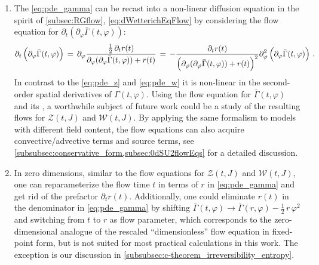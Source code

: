 \begin{enumerate}
	\item	The \pde{} \eqref{eq:pde_gamma} can be recast into a non-linear diffusion equation in the spirit of \cref{subsec:RGflow}, \viz{} \cref{eq:dWetterichEqFlow} by considering the flow equation for $\partial_t (\partial_\varphi\bar{\Gamma}(t,\varphi))$:
	\begin{align}
		\partial_t \del{\partial_\varphi\bar{\Gamma}(t,\varphi)}\, =\, \partial_\varphi\frac{\frac{1}{2} \, \partial_t r ( t )}{\partial_\varphi(\partial_\varphi\bar{\Gamma}(t,\varphi)) + r ( t )} \,=\,
		-\frac{\partial_t r ( t )}{\del{\partial_\varphi(\partial_\varphi\bar{\Gamma}(t,\varphi)) + r ( t )}^2} \partial_\varphi^2\del{\partial_\varphi\bar{\Gamma}(t,\varphi)}
		\, .	\label{eq:pde_dgamma}
	\end{align}
	In contrast to the \pdes{} \eqref{eq:pde_z} and \eqref{eq:pde_w} it is non-linear in the second-order spatial derivatives of $\Gamma ( t, \varphi )$.
	Using the flow equation for $\bar{\Gamma} ( t, \varphi )$ and its \ic{}, a worthwhile subject of future work could be a study of the resulting flows for $\mathcal{Z} ( t, J )$ and $\mathcal{W} ( t, J )$.
	By applying the same formalism to models with different field content, the \frg{} flow equations can also acquire convective/advective terms and source terms, see \cref{subsubsec:conservative_form,subsec:0dSU2flowEqs} for a detailed discussion.
			
	\item	In zero dimensions, similar to the flow equations for $\mathcal{Z} ( t, J )$ and $\mathcal{W} ( t, J )$, one can reparameterize the flow time $t$ in terms of $r$ in \cref{eq:pde_gamma} and get rid of the prefactor $\partial_t r ( t )$.
	Additionally, one could eliminate $r ( t )$ in the denominator in \cref{eq:pde_gamma} by shifting $\bar{\Gamma} ( t, \varphi ) \rightarrow \bar{\Gamma} ( r, \varphi ) - \tfrac{1}{2} \, r \, \varphi^2$ and switching from $t$ to $r$ as flow parameter, which corresponds to the zero-dimensional analogue of the rescaled  ``dimensionless'' flow equation in fixed-point form, but is not suited for most practical calculations in this work. The exception is our discussion in \cref{subsubsec:c-theorem_irreversibility_entropy}.
	

\end{enumerate}
